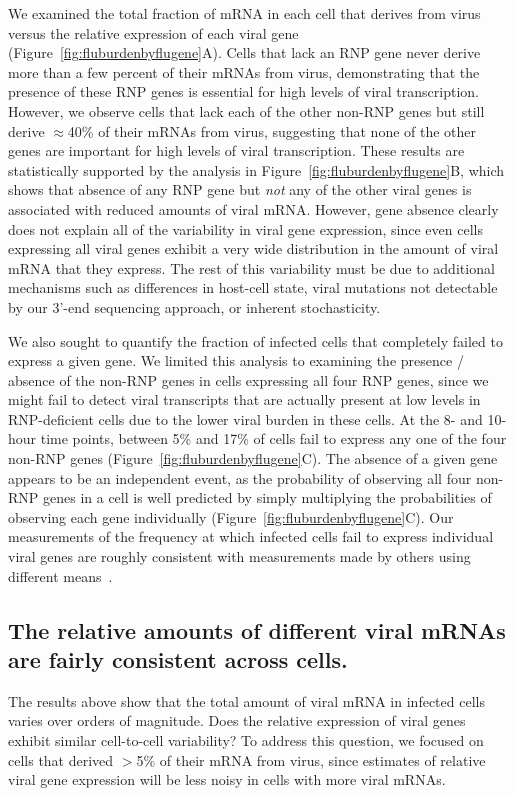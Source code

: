 \documentclass[9pt,lineno]{elife}
\begin{document}
We examined the total fraction of mRNA in each cell that derives from virus versus the relative expression of each viral gene (Figure~\ref{fig:fluburdenbyflugene}A). 
Cells that lack an RNP gene never derive more than a few percent of their mRNAs from virus, demonstrating that the presence of these RNP genes is essential for high levels of viral transcription.
However, we observe cells that lack each of the other non-RNP genes but still derive $\approx$40\% of their mRNAs from virus, suggesting that none of the other genes are important for high levels of viral transcription.
These results are statistically supported by the analysis in Figure~\ref{fig:fluburdenbyflugene}B, which shows that absence of any RNP gene but \emph{not} any of the other viral genes is associated with reduced amounts of viral mRNA. 
However, gene absence clearly does not explain all of the variability in viral gene expression, since even cells expressing all viral genes exhibit a very wide distribution in the amount of viral mRNA that they express. 
The rest of this variability must be due to additional mechanisms such as differences in host-cell state, viral mutations not detectable by our 3'-end sequencing approach, or inherent stochasticity.  

We also sought to quantify the fraction of infected cells that completely failed to express a given gene.
We limited this analysis to examining the presence / absence of the non-RNP genes in cells expressing all four RNP genes, since we might fail to detect viral transcripts that are actually present at low levels in RNP-deficient cells due to the lower viral burden in these cells.
At the 8- and 10-hour time points, between 5\% and 17\% of cells fail to express any one of the four non-RNP genes (Figure~\ref{fig:fluburdenbyflugene}C).
The absence of a given gene appears to be an independent event, as the probability of observing all four non-RNP genes in a cell is well predicted by simply multiplying the probabilities of observing each gene individually (Figure~\ref{fig:fluburdenbyflugene}C). 
Our measurements of the frequency at which infected cells fail to express individual viral genes are roughly consistent with measurements made by others using different means~\citep{brooke2013most}.
	
\subsection{The relative amounts of different viral mRNAs are fairly consistent across cells.}
The results above show that the total amount of viral mRNA in infected cells varies over orders of magnitude.
Does the relative expression of viral genes exhibit similar cell-to-cell variability?
To address this question, we focused on cells that derived $>$5\% of their mRNA from virus, since estimates of relative viral gene expression will be less noisy in cells with more viral mRNAs.
\end{document}
